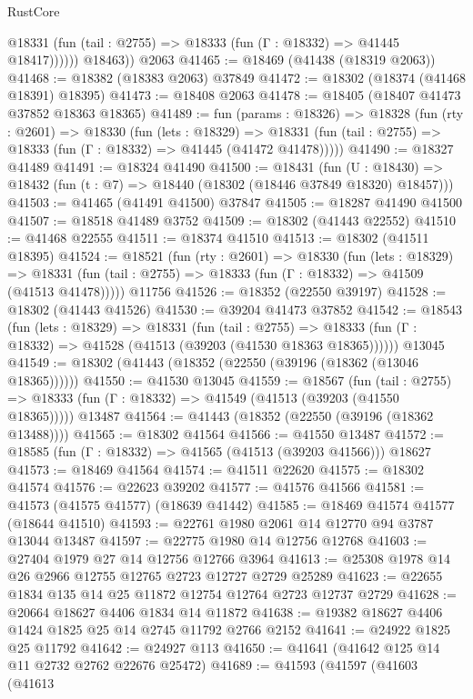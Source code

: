 \begin{lexlean}{RustCore}
\begin{coremodule}
              @18331 (fun (tail : @2755) => @18333 (fun (Γ : @18332) => @41445 @18417))))))
        @18463))
    @2063
@41465 := @18469 (@41438 (@18319 @2063))
@41468 := @18382 (@18383 @2063) @37849
@41472 := @18302 (@18374 (@41468 @18391) @18395)
@41473 := @18408 @2063
@41478 := @18405 (@18407 @41473 @37852 @18363 @18365)
@41489 := fun (params : @18326) =>
  @18328
    (fun (rty : @2601) =>
    @18330
      (fun (lets : @18329) =>
      @18331 (fun (tail : @2755) => @18333 (fun (Γ : @18332) => @41445 (@41472 @41478)))))
@41490 := @18327 @41489
@41491 := @18324 @41490
@41500 := @18431
    (fun (U : @18430) => @18432 (fun (t : @7) => @18440 (@18302 (@18446 @37849 @18320) @18457)))
@41503 := @41465 (@41491 @41500) @37847
@41505 := @18287 @41490 @41500
@41507 := @18518 @41489 @3752
@41509 := @18302 (@41443 @22552)
@41510 := @41468 @22555
@41511 := @18374 @41510
@41513 := @18302 (@41511 @18395)
@41524 := @18521
    (fun (rty : @2601) =>
    @18330
      (fun (lets : @18329) =>
      @18331 (fun (tail : @2755) => @18333 (fun (Γ : @18332) => @41509 (@41513 @41478)))))
    @11756
@41526 := @18352 (@22550 @39197)
@41528 := @18302 (@41443 @41526)
@41530 := @39204 @41473 @37852
@41542 := @18543
    (fun (lets : @18329) =>
    @18331
      (fun (tail : @2755) =>
      @18333 (fun (Γ : @18332) => @41528 (@41513 (@39203 (@41530 @18363 @18365))))))
    @13045
@41549 := @18302 (@41443 (@18352 (@22550 (@39196 (@18362 (@13046 @18365))))))
@41550 := @41530 @13045
@41559 := @18567
    (fun (tail : @2755) => @18333 (fun (Γ : @18332) => @41549 (@41513 (@39203 (@41550 @18365)))))
    @13487
@41564 := @41443 (@18352 (@22550 (@39196 (@18362 @13488))))
@41565 := @18302 @41564
@41566 := @41550 @13487
@41572 := @18585 (fun (Γ : @18332) => @41565 (@41513 (@39203 @41566))) @18627
@41573 := @18469 @41564
@41574 := @41511 @22620
@41575 := @18302 @41574
@41576 := @22623 @39202
@41577 := @41576 @41566
@41581 := @41573 (@41575 @41577) (@18639 @41442)
@41585 := @18469 @41574 @41577 (@18644 @41510)
@41593 := @22761 @1980 @2061 @14 @12770 @94 @3787 @13044 @13487
@41597 := @22775 @1980 @14 @12756 @12768
@41603 := @27404 @1979 @27 @14 @12756 @12766 @3964
@41613 := @25308 @1978 @14 @26 @2966 @12755 @12765 @2723 @12727 @2729 @25289
@41623 := @22655 @1834 @135 @14 @25 @11872 @12754 @12764 @2723 @12737 @2729
@41628 := @20664 @18627 @4406 @1834 @14 @11872
@41638 := @19382 @18627 @4406 @1424 @1825 @25 @14 @2745 @11792 @2766 @2152
@41641 := @24922 @1825 @25 @11792
@41642 := @24927 @113
@41650 := @41641 (@41642 @125 @14 @11 @2732 @2762 @22676 @25472)
@41689 := @41593
    (@41597
      (@41603
        (@41613

\end{coremodule}
\end{lexlean}
